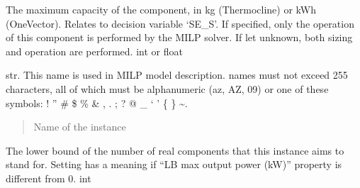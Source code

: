 \documentclass[letterpaper,10pt,english]{sphinxmanual}
\begin{document}
\begin{fulllineitems}
\begin{fulllineitems}
\label{\detokenize{generated/tamos.storage.OneVector:tamos.storage.OneVector.given_sizing}}
\pysigstartsignatures
{}
\pysigstopsignatures
\sphinxAtStartPar
The maximum capacity of the component, in kg (Thermocline) or kWh (OneVector).
Relates to decision variable ‘SE\_S’.
If specified, only the operation of this component is performed by the MILP solver.
If let unknown, both sizing and operation are performed.
int or float

\end{fulllineitems}


\begin{fulllineitems}
\label{\detokenize{generated/tamos.storage.OneVector:tamos.storage.OneVector.name}}
\pysigstartsignatures
{}
\pysigstopsignatures
\sphinxAtStartPar
str.
This name is used in MILP model description.
names must not exceed 255 characters,
all of which must be alphanumeric (a\sphinxhyphen{}z, A\sphinxhyphen{}Z, 0\sphinxhyphen{}9) or one of these symbols:
! ” \# \$ \% \& , . ; ? @ \_ ‘ ’ \{ \} \textasciitilde{}.
\begin{quote}\begin{description}
\sphinxAtStartPar
Name of the instance

\end{description}\end{quote}

\end{fulllineitems}


\begin{fulllineitems}
\label{\detokenize{generated/tamos.storage.OneVector:tamos.storage.OneVector.units_number_lb}}
\pysigstartsignatures
{}
\pysigstopsignatures
\sphinxAtStartPar
The lower bound of the number of real components that this instance aims to stand for.
Setting  has a meaning if “LB max output power (kW)” property is different from 0.
int


\end{fulllineitems}
\end{fulllineitems}
\end{document}
